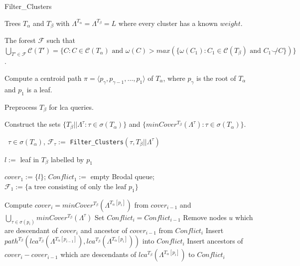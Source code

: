 \documentclass[final,1p,times]{elsarticle}
\newcommand{\compatible}{\smile}
\newcommand{\leafset}{\Lambda}
\newcommand{\weight}{\omega}
\newcommand{\TA}{T_\alpha}
\newcommand{\TB}{T_\beta}
\begin{document}
    \begin{algorithm}[!ht]
        \caption{Filter\_Clusters}
        \label{alg:filterclusters}

        \begin{algorithmic}[1]
            \Input Trees $\TA$ and $\TB$ with $\leafset^{\TA} = \leafset^{\TB} = L$ where every cluster has a known $weight$.

            \Output The forest $\mathcal{F}$ such that $\bigcup_{T' \in \mathcal{F}} \mathcal{C}(T') = \{C : C \in \mathcal{C}(\TA) \text{ and } \weight(C) > max(\{\weight(C_1) : C_1 \in \mathcal{C}(\TB) \text{ and } C_1 \not\compatible C\})\}$.

            \State Compute a centroid path $\pi = \langle p_{\gamma}, p_{\gamma - 1}, \dots, p_1 \rangle$ of $\TA$, where $p_{\gamma}$ is the root of $\TA$ and $p_1$ is a leaf.
            \label{step:centroidpath}

            \State Preprocess $\TB$ for lca queries.
            \label{step:preprocesslca}

            \State Construct the sets $\{\TB||\leafset^{\tau} : \tau \in \sigma(\TA)\}$ and $\{minCover^{\TB}(\leafset^{\tau}) : \tau \in \sigma(\TA)\}$.
            \label{step:constructrestrictedweighted}

            \State \algorithmicforall\ $\tau \in \sigma(\TA)$, $\mathcal{F}_{\tau} :=$ \texttt{Filter\_Clusters}$(\tau, \TB||\leafset^{\tau})$
            \label{step:recursivecall}

            \State $l :=$ leaf in $\TB$ labelled by $p_1$

            \State $cover_1 := \{l\}$; $Conflict_1 :=$ empty Brodal queue; $\mathcal{F}_1 := \{\text{a tree consisting of only the leaf } p_1\}$

                \label{step:outerfor}
		\State Compute $cover_i = minCover^{\TB}(\leafset^{T_{\alpha}[p_i]})$ from $cover_{i-1}$ and $\bigcup_{\tau \in \sigma(p_i)} minCover^{\TB}(\leafset^{\tau})$
		\State Set $Conflict_i = Conflict_{i-1}$
		\label{step:start_build_conflict}
		\State Remove nodes $u$ which are descendant of $cover_{i}$ and ancestor of $cover_{i-1}$ from $Conflict_{i}$
		\State Insert $path^{T_{\beta}}(lca^{T_{\beta}}(\leafset^{T_{\alpha}[p_{i-1}]}), lca^{T_{\beta}}(\leafset^{T_{\alpha}[p_{i}]}))$ into $Conflict_{i}$
		\State Insert ancestors of $cover_{i} - cover_{i-1}$ which are descendants of $lca^{T_{\beta}}(\leafset^{T_{\alpha}[p_i]})$ to $Conflict_i$
		\label{step:end_build_conflict}
%
%
%
%
%


\end{algorithmic}
\end{algorithm}
\end{document}
